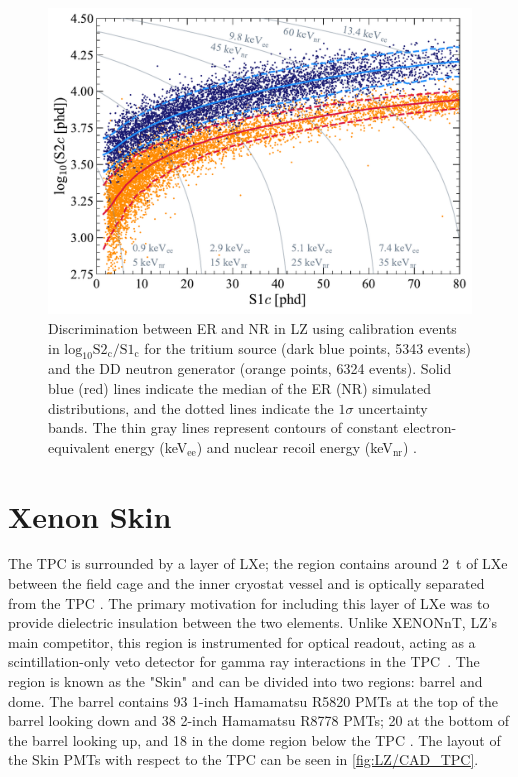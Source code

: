 \begin{figure}[!ht]
    \centering
    \includegraphics[width=0.7\linewidth]{figures/LZ/SR1WS_calOnly_0629.pdf}
    \caption[Discrimination between ER and NR in LZ using calibration events.]{Discrimination between ER and NR in LZ using calibration events in $\text{log}_{10}\text{S2}_{\text{c}}/\text{S1}_{\text{c}}$ for the tritium source (dark blue points, 5343 events) and the DD neutron generator (orange points, 6324 events). Solid blue (red) lines indicate the median of the ER (NR) simulated distributions, and the dotted lines indicate the $1\sigma$ uncertainty bands. The thin gray lines represent contours of constant electron-equivalent energy (keV$_{\text{ee}}$) and nuclear recoil energy (keV$_{\text{nr}}$) \cite{LZ:2022lsv}.}
    \label{fig:LZ/NRERBandExample}
\end{figure}

\section{Xenon Skin}\label{sec:LZ/Skin}
The TPC is surrounded by a layer of LXe; the region contains around 2~t of LXe between the field cage and the inner cryostat vessel and is optically separated from the TPC \cite{LZNIMA}. The primary motivation for including this layer of LXe was to provide dielectric insulation between the two elements. Unlike XENONnT, LZ's main competitor, this region is instrumented for optical readout, acting as a scintillation-only veto detector for gamma ray interactions in the TPC~\cite{XENON:2024wpa}. The region is known as the "Skin" and can be divided into two regions: barrel and dome. The barrel contains 93 1-inch Hamamatsu R5820 PMTs at the top of the barrel looking down and 38 2-inch Hamamatsu R8778 PMTs; 20 at the bottom of the barrel looking up, and 18 in the dome region below the TPC \cite{LZNIMA}. The layout of the Skin PMTs with respect to the TPC can be seen in \autoref{fig:LZ/CAD_TPC}.

